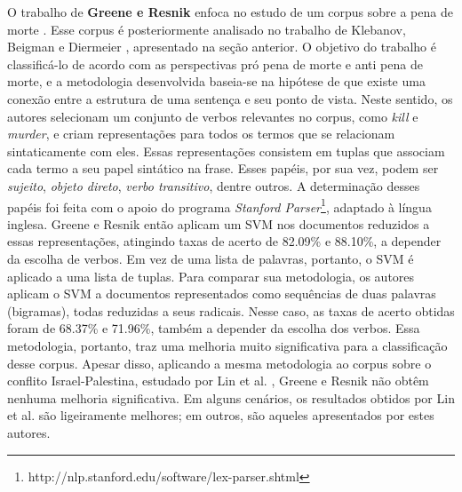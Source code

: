 
O trabalho de \textbf{Greene e Resnik} enfoca no estudo de um corpus sobre a pena de morte \cite{greene}. Esse corpus é posteriormente analisado no trabalho de Klebanov, Beigman e Diermeier \cite{klebanov}, apresentado na seção anterior. O objetivo do trabalho é classificá-lo de acordo com as perspectivas pró pena de morte e anti pena de morte, e a metodologia desenvolvida baseia-se na hipótese de que existe uma conexão entre a estrutura de uma sentença e seu ponto de vista. Neste sentido, os autores selecionam um conjunto de verbos relevantes no corpus, como \emph{kill} e \emph{murder}, e criam representações para todos os termos que se relacionam sintaticamente com eles. Essas representações consistem em tuplas que associam cada termo a seu papel sintático na frase. Esses papéis, por sua vez, podem ser \emph{sujeito}, \emph{objeto direto}, \emph{verbo transitivo}, dentre outros. A determinação desses papéis foi feita com o apoio do programa \emph{Stanford Parser}\footnote{http://nlp.stanford.edu/software/lex-parser.shtml}, adaptado à língua inglesa. Greene e Resnik então aplicam um SVM nos documentos reduzidos a essas representações, atingindo taxas de acerto de 82.09\% e 88.10\%, a depender da escolha de verbos. Em vez de uma lista de palavras, portanto, o SVM é aplicado a uma lista de tuplas. Para comparar sua metodologia, os autores aplicam o SVM a documentos representados como sequências de duas palavras (bigramas), todas reduzidas a seus radicais. Nesse caso, as taxas de acerto obtidas foram de 68.37\% e 71.96\%, também a depender da escolha dos verbos. Essa metodologia, portanto, traz uma melhoria muito significativa para a classificação desse corpus. Apesar disso, aplicando a mesma metodologia ao corpus sobre o conflito Israel-Palestina, estudado por Lin et al. \cite{lin-et-al2006}, Greene e Resnik não obtêm nenhuma melhoria significativa. Em alguns cenários, os resultados obtidos por Lin et al. são ligeiramente melhores; em outros, são aqueles apresentados por estes autores.

